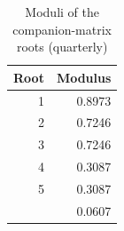 \begin{table}

\caption{\label{tab:stability}Moduli of the companion-matrix roots (quarterly)}
\centering
\begin{tabular}[t]{rr}
\toprule
Root & Modulus\\
\midrule
1 & 0.8973\\
2 & 0.7246\\
3 & 0.7246\\
4 & 0.3087\\
5 & 0.3087\\
\addlinespace
6 & 0.0607\\
\bottomrule
\end{tabular}
\end{table}
